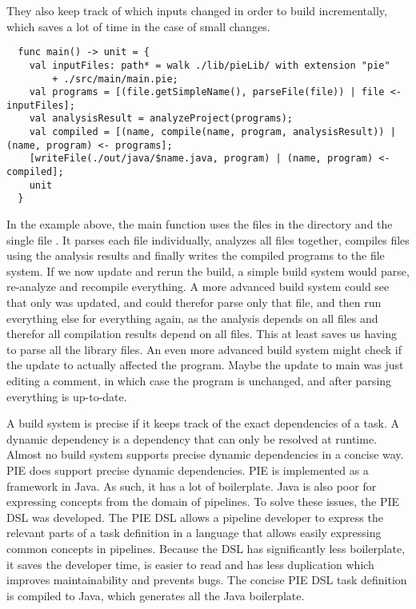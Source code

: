 They also keep track of which inputs changed in order to build incrementally, which saves a lot of time in the case of small changes.
\begin{lstlisting}
  func main() -> unit = {
    val inputFiles: path* = walk ./lib/pieLib/ with extension "pie"
        + ./src/main/main.pie;
    val programs = [(file.getSimpleName(), parseFile(file)) | file <- inputFiles];
    val analysisResult = analyzeProject(programs);
    val compiled = [(name, compile(name, program, analysisResult)) | (name, program) <- programs];
    [writeFile(./out/java/$name.java, program) | (name, program) <- compiled];
    unit
  }
\end{lstlisting}
In the example above, the main function uses the files in the directory  and the single file .
It parses each file individually, analyzes all files together, compiles files using the analysis results and finally writes the compiled programs to the file system.
If we now update  and rerun the build, a simple build system would parse, re-analyze and recompile everything.
A more advanced build system could see that only  was updated, and could therefor parse only that file, and then run everything else for everything again, as the analysis depends on all files and therefor all compilation results depend on all files.
This at least saves us having to parse all the library files.
An even more advanced build system might check if the update to  actually affected the program.
Maybe the update to main was just editing a comment, in which case the program is unchanged, and after parsing  everything is up-to-date.

A build system is precise if it keeps track of the exact dependencies of a task.
A dynamic dependency is a dependency that can only be resolved at runtime.
Almost no build system supports precise dynamic dependencies in a concise way.
\Ac{PIE} does support precise dynamic dependencies.
\Ac{PIE} is implemented as a framework in Java.
As such, it has a lot of boilerplate.
Java is also poor for expressing concepts from the domain of pipelines.
To solve these issues, the \ac{PIE} \ac{DSL} was developed.
The \ac{PIE} \ac{DSL} allows a pipeline developer to express the relevant parts of a task definition in a language that allows easily expressing common concepts in pipelines.
Because the \ac{DSL} has significantly less boilerplate, it saves the developer time, is easier to read and has less duplication which improves maintainability and prevents bugs. 
The concise \ac{PIE} \ac{DSL} task definition is compiled to Java, which generates all the Java boilerplate.

